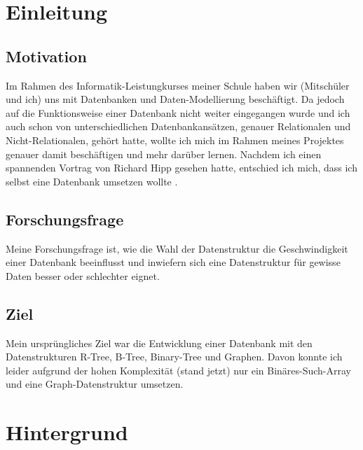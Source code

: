 \documentclass[11pt,a4paper]{article}
\begin{document}
\clearpage


\renewcommand*\contentsname{Inhaltsverzeichnis}


\tableofcontents

\clearpage

\pagestyle{plain}

\section{Einleitung}

\subsection{Motivation}

Im Rahmen des Informatik-Leistungkurses meiner Schule haben wir (Mitschüler und ich) uns
mit Datenbanken und Daten-Modellierung beschäftigt. Da jedoch auf die Funktionsweise einer
Datenbank nicht weiter eingegangen wurde und ich auch schon von unterschiedlichen
Datenbankansätzen, genauer Relationalen und Nicht-Relationalen, gehört hatte,
wollte ich mich im Rahmen meines Projektes genauer damit beschäftigen
und mehr darüber lernen.
Nachdem ich einen spannenden Vortrag von Richard Hipp gesehen hatte,
entschied ich mich, dass ich selbst eine Datenbank umsetzen wollte \cite{sql_ideas}.

\subsection{Forschungsfrage}

Meine Forschungsfrage ist, wie die Wahl der Datenstruktur die
Geschwindigkeit einer Datenbank beeinflusst und inwiefern sich eine Datenstruktur
für gewisse Daten besser oder schlechter eignet.

\subsection{Ziel}

Mein ursprüngliches Ziel war die Entwicklung einer Datenbank
mit den Datenstrukturen R-Tree, B-Tree, Binary-Tree und Graphen.
Davon konnte ich leider aufgrund der hohen Komplexität (stand jetzt) nur ein
Binäres-Such-Array und eine Graph-Datenstruktur umsetzen.

\clearpage

\section{Hintergrund}
\end{document}
